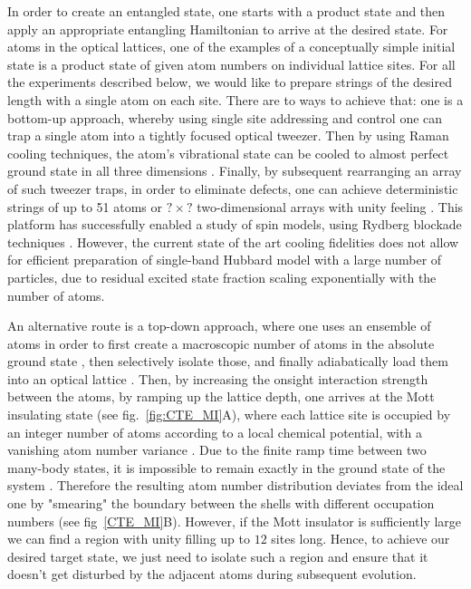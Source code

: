 In order to create an entangled state, one starts with a product state and then apply an appropriate entangling Hamiltonian to arrive at the desired state.  For atoms in the optical lattices, one of the examples of a conceptually simple initial state is a product state of given atom numbers on individual lattice sites. For all the experiments described below, we would like to prepare strings of the desired length with a single atom on each site. There are to ways to achieve that: one is a bottom-up approach, whereby using single site addressing and control one can trap a single atom into a tightly focused optical tweezer. Then by using Raman cooling techniques, the atom's vibrational state can be cooled to almost perfect ground state in all three dimensions \cite{adamo, selim}. Finally, by subsequent rearranging an array of such tweezer traps, in order to eliminate defects, one can achieve deterministic strings of up to 51 atoms \cite{misha} or $?\times?$ two-dimensional arrays with unity feeling \cite{broweys}. This platform has successfully enabled a study of spin models, using Rydberg blockade techniques \cite{misha}. However, the current state of the art cooling fidelities does not allow for efficient preparation of single-band Hubbard model with a large number of particles, due to residual excited state fraction scaling exponentially with the number of atoms.

An alternative route is a top-down approach, where one uses an ensemble of atoms in order to first create a macroscopic number of atoms in the absolute ground state \cite{BEC, DFG}, then selectively isolate those, and finally adiabatically load them into an optical lattice \cite{Greiner2002}. Then, by increasing the onsight interaction strength between the atoms, by ramping up the lattice depth, one arrives at the Mott insulating state (see fig.~\ref{fig:CTE_MI}A), where each lattice site is occupied by an integer number of atoms according to a local chemical potential, with a vanishing atom number variance \cite{Bakr2010, Bloch MI}. Due to the finite ramp time between two many-body states, it is impossible to remain exactly in the ground state of the system \cite{subir phase transition}. Therefore the resulting atom number distribution deviates from the ideal one by "smearing" the boundary between the shells with different occupation numbers (see fig~\ref{CTE_MI}B). However, if the Mott insulator is sufficiently large we can find a region with unity filling up to $12$ sites long. Hence, to achieve our desired target state, we just need to isolate such a region and ensure that it doesn't get disturbed by the adjacent atoms during subsequent evolution.

